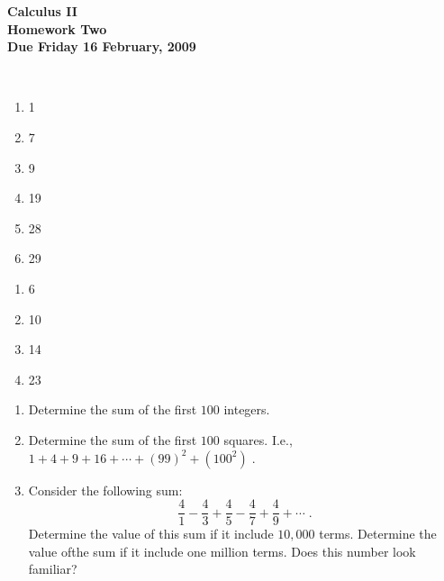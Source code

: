 \documentclass[12pt]{article}
\begin{document}
\pagestyle{empty}
 
\begin{center}
{\large {\bf Calculus II}}\\
\medskip
{\large {\bf Homework Two}}\\
\medskip
{ {\bf Due Friday 16 February, 2009}}\\
\end{center}

\hspace{2mm}\\


\begin{enumerate}
\setlength{\itemsep}{-1mm}
  \item 1
  \item 7
  \item 9
  \item 19
  \item 28
  \item 29

\end{enumerate}


\begin{enumerate}
\setlength{\itemsep}{-1mm}
  \item 6
  \item 10
  \item 14
  \item 23

\end{enumerate}


\begin{enumerate}
\setlength{\itemsep}{-1mm}
  \item Determine the sum of the first $100$ integers.
  \item Determine the sum of the first $100$ squares. I.e., $1 + 4 + 9
  +16 + \cdots + (99)^2 + (100^2) \;$.
  \item Consider the following sum:
\begin{equation}
  \frac{4}{1} - \frac{4}{3} + \frac{4}{5} - \frac{4}{7} + \frac{4}{9}
  + \cdots \;.
\end{equation}
Determine the value of this sum if it include $10,000$ terms.  Determine
  the value ofthe sum if it include one million terms.  Does this
  number look familiar?
\end{enumerate}
\end{document}
